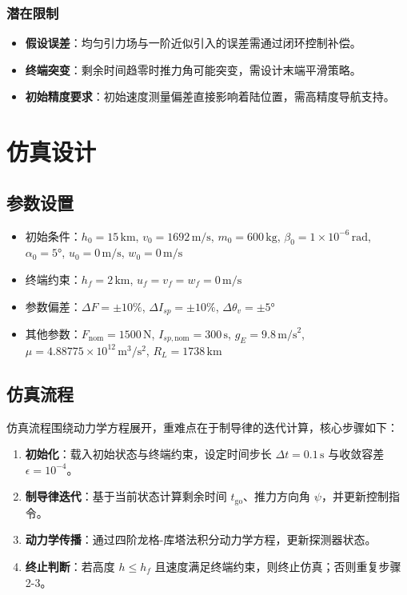 \documentclass[12pt,a4paper]{article}
\begin{document}
\subsubsection{潜在限制}
\begin{itemize}
    \item \textbf{假设误差}：均匀引力场与一阶近似引入的误差需通过闭环控制补偿。
    \item \textbf{终端突变}：剩余时间趋零时推力角可能突变，需设计末端平滑策略。
    \item \textbf{初始精度要求}：初始速度测量偏差直接影响着陆位置，需高精度导航支持。
\end{itemize}

\section{仿真设计}
\subsection{参数设置}
\begin{itemize}
    \item 初始条件：\(h_0 = 15 \, \text{km}\), \(v_0 = 1692 \, \text{m/s}\), \(m_0 = 600 \, \text{kg}\), \(\beta_0 = 1 \times 10^{-6} \, \text{rad}\), \(\alpha_0 = 5°\), \(u_0 = 0 \, \text{m/s}\), \(w_0 = 0 \, \text{m/s}\)
    \item 终端约束：\(h_f = 2 \, \text{km}\), \(u_f = v_f = w_f = 0 \, \text{m/s}\)
    \item 参数偏差：\(\Delta F = \pm 10\%\), \(\Delta I_{sp} = \pm 10\%\), \(\Delta \theta_{v} = \pm 5°\)
    \item 其他参数：\(F_{\text{nom}} = 1500 \, \text{N}\), \(I_{sp,\text{nom}} = 300 \, \text{s}\), \(g_E = 9.8 \, \text{m/s}^2\), \(\mu = 4.88775 \times 10^{12} \, \text{m}^3/\text{s}^2\), \(R_L = 1738 \, \text{km}\)
\end{itemize}

\subsection{仿真流程}
仿真流程围绕动力学方程展开，重难点在于制导律的迭代计算，核心步骤如下：
\begin{enumerate}
    \item \textbf{初始化}：载入初始状态与终端约束，设定时间步长 \( \Delta t = 0.1 \, \text{s} \) 与收敛容差 \( \epsilon = 10^{-4} \)。
    \item \textbf{制导律迭代}：基于当前状态计算剩余时间 \( t_{\text{go}} \)、推力方向角 \( \psi \)，并更新控制指令。
    \item \textbf{动力学传播}：通过四阶龙格-库塔法积分动力学方程，更新探测器状态。
    \item \textbf{终止判断}：若高度 \( h \leq h_f \) 且速度满足终端约束，则终止仿真；否则重复步骤2-3。
\end{enumerate}
\end{document}
